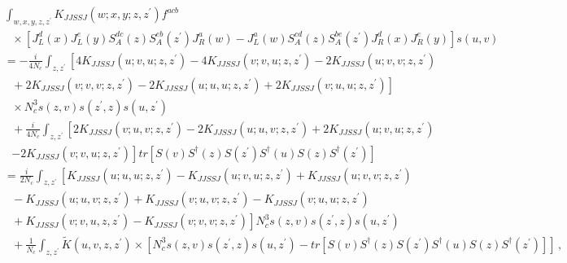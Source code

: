 \documentclass[11pt,a4paper]{article}
\begin{document}
   \begin{eqnarray}
&&\int_{w,x,y,z,z^{\prime}}K_{JJSSJ}(w;x,y;z,z^{\prime})f^{acb}\nonumber \\
&&\ \ \ \times \left[J_{L}^{d}(x)J_{L}^{e}(y)S_A^{dc}(z)S_A^{eb}(z^{\prime})J_{R}^{a}(w)-J_{L}^{a}(w)S_A^{cd}(z)S_A^{be}(z^{\prime})J_{R}^{d}(x)J_{R}^{e}(y)\right]s(u,v)\nonumber 
\\
&&=-\frac{i}{4N_{c}}\int_{z,z^{\prime}}\left[4K_{JJSSJ}(u;v,u;z,z^{\prime})-4K_{JJSSJ}(v;v,u;z,z^{\prime})-2K_{JJSSJ}(u;v,v;z,z^{\prime})\right. \nonumber \\
&&\left. \ \ \ + 2K_{JJSSJ}(v;v,v;z,z^{\prime})-2K_{JJSSJ}(u;u,u;z,z^{\prime})+2K_{JJSSJ}(v;u,u;z,z^{\prime})\right]\nonumber \\
&&\ \ \ \times N_{c}^{3}s(z,v)s(z^{\prime},z)s(u,z^{\prime})\nonumber \\
&&\ \ \ +\frac{i}{4N_{c}}\int_{z,z^{\prime}}\left[2K_{JJSSJ}(v;u,v;z,z^{\prime})-2K_{JJSSJ}(u;u,v;z,z^{\prime})+2K_{JJSSJ}(u;v,u;z,z^{\prime})\right.\nonumber \\
&&\ \ \ \left. -2K_{JJSSJ}(v;v,u;z,z^{\prime})\right]
tr\left[S(v)S^{\dagger}(z)S(z^{\prime})S^{\dagger}(u)S(z)S^{\dagger}(z^{\prime})\right]\nonumber \\
&&=\frac{i}{2N_{c}}\int_{z,z^{\prime}}\left[K_{JJSSJ}(u;u,u;z,z^{\prime})-K_{JJSSJ}(u;v,u;z,z^{\prime})+K_{JJSSJ}(u;v,v;z,z^{\prime})\right. \nonumber \\
&& \ \ \ -K_{JJSSJ}(u;u,v;z,z^{\prime})+K_{JJSSJ}(v;u,v;z,z^{\prime})-K_{JJSSJ}(v;u,u;z,z^{\prime})\nonumber \\
&&\left. \ \ \ +K_{JJSSJ}(v;v,u,z,z^{\prime})-K_{JJSSJ}(v;v,v;z,z^{\prime})\right]
N_{c}^{3}s(z,v)s(z^{\prime},z)s(u,z^{\prime})\nonumber \\
&&\ \ \ +\frac{1}{N_{c}}\int_{z,z^{\prime}}\widetilde{K}(u,v,z,z^{\prime})\times\left[N_{c}^{3}s(z,v)s(z^{\prime},z)s(u,z^{\prime})-tr\left[S(v)S^{\dagger}(z)S(z^{\prime})S^{\dagger}(u)S(z)S^{\dagger}(z^{\prime})\right]\right]\, , \nonumber \\
\end{eqnarray}
\end{document}
